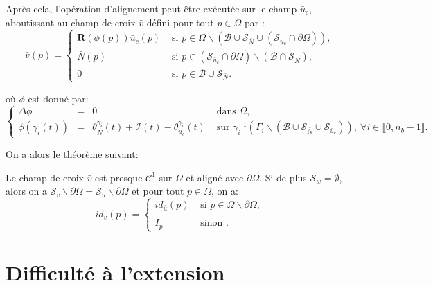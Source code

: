 Après cela, l'opération d'alignement peut être exécutée sur le champ $\bar{u}_c$, aboutissant au champ de croix $\bar{v}$ défini pour tout $p\in\Omega$ par :
\begin{equation}
\bar{v}(p)=
\left\{
\begin{array}{ll}
\mathbf{R}(\phi(p))\bar{u}_c(p) & \mbox{ si } p\in\Omega\backslash(\mathcal{B}\cup\mathcal{S}_{\bar{N}}\cup(\mathcal{S}_{\bar{u}_c}\cap\partial\Omega)),\\[0.5cm]
\bar{N}(p) & \mbox{ si } p\in(\mathcal{S}_{\bar{u}_c}\cap\partial\Omega)\backslash(\mathcal{B}\cap\mathcal{S}_{\bar{N}}),\\[0.5cm]
0 & \mbox{ si } p\in\mathcal{B}\cup\mathcal{S}_{\bar{N}}.
\end{array}
\right.
\end{equation}

où $\phi$ est donné par:
\begin{equation}
\left\{
\begin{array}{lcll}
\Delta\phi &=& 0 &\mbox{ dans }\Omega,\\[0.5cm]
\phi(\gamma_i(t))&=&\theta_{\bar{N}}^{\gamma_i}(t)+\mathcal{I}(t)-\theta_{\bar{u}_c}^{\gamma_i}(t) & \mbox{ sur } \gamma_i^{-1}(\Gamma_i\backslash(\mathcal{B}\cup\mathcal{S}_{\bar{N}}\cup\mathcal{S}_{\bar{u}_c})),~\forall i\in\llbracket 0, n_b-1\rrbracket.
\end{array}
\right.
\end{equation}

On a alors le théorème suivant:
\begin{theorem}
Le champ de croix $\bar{v}$ est presque-$\mathcal{C}^1$ sur $\Omega$ et aligné avec $\partial\Omega$. Si de plus $\mathcal{S}_{\bar{w}}=\emptyset$, alors on a $\mathcal{S}_{\bar{v}}\backslash\partial\Omega=\mathcal{S}_{\bar{u}}\backslash\partial\Omega$ et pour tout $p\in\Omega$, on a:
\begin{equation}
id_{\bar{v}}(p)=
\left\{
\begin{array}{ll}
    id_{\bar{u}}(p) & \mbox{ si } p\in\Omega\backslash\partial\Omega,\\\\
    I_p & \mbox{ sinon }.
\end{array}
\right.
\end{equation}
\end{theorem}


\section{Difficulté à l'extension}

